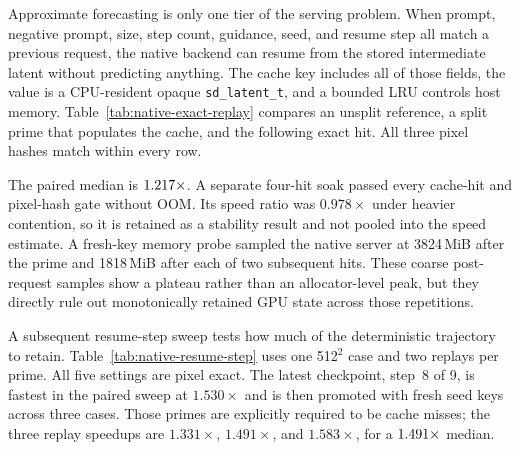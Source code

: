 \documentclass[11pt,a4paper]{article}
\begin{document}
Approximate forecasting is only one tier of the serving problem. When prompt,
negative prompt, size, step count, guidance, seed, and resume step all match a
previous request, the native backend can resume from the stored intermediate
latent without predicting anything. The cache key includes all of those fields,
the value is a CPU-resident opaque \texttt{sd\_latent\_t}, and a bounded LRU
controls host memory. Table~\ref{tab:native-exact-replay} compares an unsplit
reference, a split prime that populates the cache, and the following exact hit.
All three pixel hashes match within every row.

\begin{table}[H]
\centering
\small

\caption{Exact latent replay on the live shared RTX~5090 service with a
9-step Z-Image-Turbo Q4\_K backend. Speedup compares the split prime with its
cache-hit replay; the unsplit baseline is the exactness reference. Shared-load
timings are paired observations, not idle-device throughput.}
\label{tab:native-exact-replay}
\end{table}

The paired median is $1.217\times$. A separate four-hit
soak passed every cache-hit and pixel-hash gate without OOM. Its speed ratio was
$0.978\times$ under heavier contention, so it is retained as a stability result
and not pooled into the speed estimate. A fresh-key memory probe sampled the
native server at 3824\,MiB after the prime and 1818\,MiB after each of two
subsequent hits. These coarse post-request samples show a plateau rather than
an allocator-level peak, but they directly rule out monotonically retained GPU
state across those repetitions.

A subsequent resume-step sweep tests how much of the deterministic trajectory
to retain. Table~\ref{tab:native-resume-step} uses one 512$^2$ case and two
replays per prime. All five settings are pixel exact. The latest checkpoint,
step~8 of 9, is fastest in the paired sweep at $1.530\times$ and is then promoted
with fresh seed keys across three cases. Those primes are explicitly required
to be cache misses; the three replay speedups are $1.331\times$,
$1.491\times$, and $1.583\times$, for a
$1.491\times$ median.

\begin{table}[H]
\centering
\small

\caption{Exact replay resume-step sweep on the live shared RTX~5090. Every
prime is the first request for its step-specific key and each replay hash
matches its unsplit reference. Shared-load variance makes the intermediate
ordering noisy, while the latest exact state consistently saves the most
remaining denoiser work.}
\label{tab:native-resume-step}
\end{table}
\end{document}
